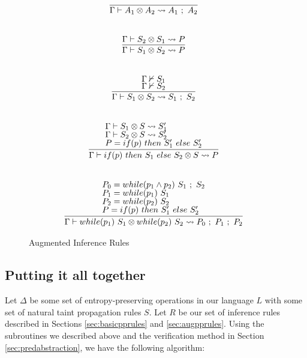 \documentclass[letterpaper,twocolumn,10pt]{article}
\newcommand{\cross}{\otimes{}}
\begin{document}
\begin{figure}
    \caption{Augmented Inference Rules}
    \label{fig:auginfrules2}
    \[
		\begin{array}{c}
			\infer[]{\Gamma \vdash A_1 \cross A_2 \leadsto A_1\ ;\ A_2}{} \\ \\ \\
			\infer[]{\Gamma \vdash S_1 \cross S_2 \leadsto P}{
				\Gamma \vdash S_2 \cross S_1 \leadsto P
			} \\ \\ \\
			\infer[]{\Gamma \vdash S_1 \cross S_2 \leadsto S_1\ ;\ S_2}{
				\Gamma \nvdash S_1 \\
				\Gamma \nvdash S_2
			} \\ \\ \\
			\infer[]{\Gamma \vdash if(p)\ then\ S_1\ else\ S_2 \cross S \leadsto P}{
				\text{$\Gamma \vdash S_1 \cross S \leadsto S_1'$} \\
				\text{$\Gamma \vdash S_2 \cross S \leadsto S_2'$} \\
				\text{$P = if(p)\ then\ S_1'\ else\ S_2'$}
			} \\ \\ \\
			\infer[]{\Gamma \vdash while(p_1)\ S_1 \cross while(p_2)\ S_2 \leadsto P_0\ ;\ P_1\ ;\ P_2}{
				\text{$P_0 = while(p_1 \land p_2)\ S_1\ ;\ S_2$} \\
				\text{$P_1 = while(p_1)\ S_1$} \\
				\text{$P_2 = while(p_2)\ S_2$} \\
				\text{$P = if(p)\ then\ S_1'\ else\ S_2'$}
			}
		\end{array}
    \]
\end{figure}


\subsection{Putting it all together}
\label{sec:all-together}

Let $\Delta$ be some set of entropy-preserving operations in our language $L$ with some set of 
natural taint propagation rules $S$.
Let $R$ be our set of inference rules described in Sections \ref{sec:basicpprules} and \ref{sec:augpprules}.
Using the subroutines we described above and the verification method in Section
\ref{sec:predabstraction}, we have the following algorithm:
\end{document}

